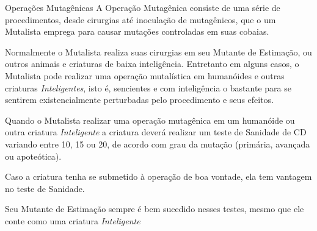 \documentclass[letterpaper,twocolumn,openany]{dndbook}
\begin{document}
	\begin{paperbox}[float=!b]{Operações Mutagênicas}
		\label{box:cirurgias_mutagenicas}
		A Operação Mutagênica consiste de uma série de procedimentos, desde cirurgias até inoculação de mutagênicos, que o um Mutalista emprega para causar mutações controladas em suas cobaias.
		\par Normalmente o Mutalista realiza suas cirurgias em seu Mutante de Estimação, ou outros animais e criaturas de baixa inteligência. Entretanto em alguns casos, o Mutalista pode realizar uma operação mutalística em humanóides e outras criaturas \textit{Inteligentes}, isto é, sencientes e com inteligência o bastante para se sentirem existencialmente perturbadas pelo procedimento e seus efeitos.
		\par Quando o Mutalista realizar uma operação mutagênica em um humanóide ou outra criatura \textit{Inteligente} a criatura deverá realizar um teste de Sanidade de CD variando entre 10, 15 ou 20, de acordo com grau da mutação (primária, avançada ou apoteótica).
		\par Caso a criatura tenha se submetido à operação de boa vontade, ela tem vantagem no teste de Sanidade.
		\par Seu Mutante de Estimação sempre é bem sucedido nesses testes, mesmo que ele conte como uma criatura \textit{Inteligente}
	\end{paperbox}
	
\end{document}
